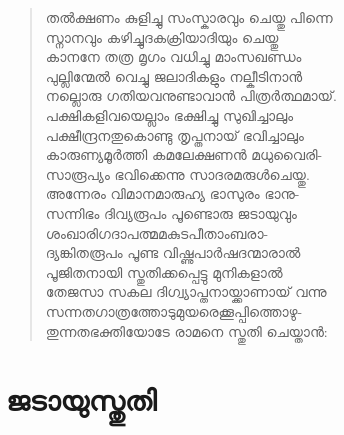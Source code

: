 \begin{verse}
തല്‍ക്ഷണം കുളിച്ചു സംസ്കാരവും ചെയ്തു പിന്നെ\\
സ്നാനവും കഴിച്ചുദകക്രിയാദിയും ചെയ്തു\\
കാനനേ തത്ര മൃഗം വധിച്ചു മാംസഖണ്ഡം\\
പുല്ലിന്മേല്‍ വെച്ചു ജലാദികളും നല്കീടിനാന്‍\\
നല്ലൊരു ഗതിയവനുണ്ടാവാന്‍ പിത്രര്‍ത്ഥമായ്.\\
പക്ഷികളിവയെല്ലാം ഭക്ഷിച്ചു സുഖിച്ചാലും\\
പക്ഷീന്ദ്രനതുകൊണ്ടു തൃപ്തനായ് ഭവിച്ചാലും\\
കാരുണ്യമൂര്‍ത്തി കമലേക്ഷണന്‍ മധുവൈരി-\\
സാരൂപ്യം ഭവിക്കെന്നു സാദരമരുള്‍ചെയ്തു.\\
അന്നേരം വിമാനമാരുഹ്യ ഭാസുരം ഭാനു-\\
സന്നിഭം ദിവ്യരൂപം പൂണ്ടൊരു ജടായുവും\\
ശംഖാരിഗദാപത്മമകുടപീതാംബരാ-\\
ദ്യങ്കിതരൂപം പൂണ്ട വിഷ്ണുപാര്‍ഷദന്മാരാല്‍\\
പൂജിതനായി സ്തുതിക്കപ്പെട്ടു മുനികളാല്‍\\
തേജസാ സകല ദിഗ്വ്യാപ്തനായ്ക്കാണായ് വന്നു\\
സന്നതഗാത്രത്തോടുമുയരെക്കൂപ്പിത്തൊഴു-\\
തുന്നതഭക്തിയോടേ രാമനെ സ്തുതി ചെയ്താന്‍:
\end{verse}

\section{ജടായുസ്തുതി}

